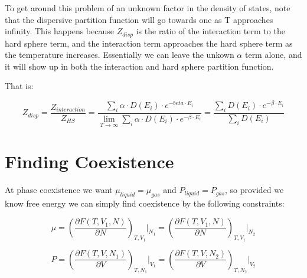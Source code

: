 To get around this problem of an unknown factor in the density of states, note that the dispersive partition function will go towards one as T approaches infinity. This happens because $Z_{disp}$ is the ratio of the interaction term to the hard sphere term, and the interaction term approaches the hard sphere term as the temperature increases. Essentially we can leave the unkown $\alpha$ term alone, and it will show up in both the interaction and hard sphere partition function.

That is:

\begin{equation}\label{eq:MCDISP8}
Z_{disp}=\frac{Z_{interaction}}{Z_{HS}}=\frac{\sum_i \alpha\cdot D(E_i)\cdot e^{-beta\cdot E_i}}{\lim_{T\to\infty}\sum_i \alpha\cdot D(E_i)\cdot e^{-\beta\cdot E_i}}=\frac{\sum_i D(E_i)\cdot e^{-\beta\cdot E_i}}{\sum_i D(E_i)}
\end{equation}
\section{Finding Coexistence}
At phase coexistence we want $\mu_{liquid}=\mu_{gas}$ and $P_{liquid}=P_{gas}$, so provided we know free energy we can simply find coexistence by the following constraints:

\begin{equation}\label{eq:methodsMu}
\mu=\left(\frac{\partial F(T,V_1,N)}{\partial N}\right)_{T,V_1}\Bigg|_{N_1}=\left(\frac{\partial F(T,V_1,N)}{\partial N}\right)_{T,V_1}\Bigg|_{N_2}
\end{equation}

\begin{equation}\label{eq:methodsP}
P=\left(\frac{\partial F(T,V,N_1)}{\partial V}\right)_{T,N_1}\Bigr|_{V_1}=\left(\frac{\partial F(T,V,N_2)}{\partial V}\right)_{T,N_2}\Bigr|_{V_2}
\end{equation}

